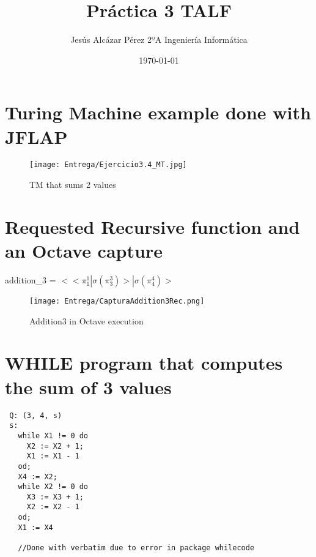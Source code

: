 \documentclass[12pt]{article}
\title{Práctica 3 TALF}
\author{Jesús Alcázar Pérez 2ºA Ingeniería Informática}
\date{\today}
\begin{document}
\maketitle
\thispagestyle{plain}

\section{Turing Machine example done with JFLAP}
\begin{figure}[htp]
\centering
\texttt{[image: Entrega/Ejercicio3.4\_MT.jpg]}
\caption{TM that sums 2 values}
\end{figure}


\section{Requested Recursive function and an Octave capture}
\centering
addition\_3 = $<<\pi^1_1|\sigma(\pi^3_3)>| \sigma(\pi^4_4)>$ 
\begin{figure}[htp]
\centering
\texttt{[image: Entrega/CapturaAddition3Rec.png]}
\caption{Addition3 in Octave execution}
\label{}
\end{figure}


\newpage
\section{WHILE program that computes the sum of 3 values}
\centering
\begin{verbatim}
 Q: (3, 4, s)
 s:
   while X1 != 0 do
     X2 := X2 + 1;
     X1 := X1 - 1
   od;
   X4 := X2;
   while X2 != 0 do
     X3 := X3 + 1;
     X2 := X2 - 1
   od;
   X1 := X4
   
   //Done with verbatim due to error in package whilecode

\end{verbatim}
\end{document}
